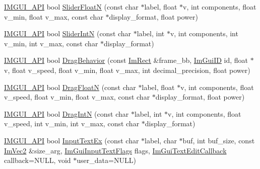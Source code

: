 \begin{DoxyCompactItemize}
\item 
\mbox{\hyperlink{imgui_8h_a43829975e84e45d1149597467a14bbf5}{I\+M\+G\+U\+I\+\_\+\+A\+PI}} bool \mbox{\hyperlink{namespace_im_gui_a3ffffbdfe59f18a2321dd1cb39dfb6e1}{Slider\+FloatN}} (const char $\ast$label, float $\ast$v, int components, float v\+\_\+min, float v\+\_\+max, const char $\ast$display\+\_\+format, float power)
\item 
\mbox{\hyperlink{imgui_8h_a43829975e84e45d1149597467a14bbf5}{I\+M\+G\+U\+I\+\_\+\+A\+PI}} bool \mbox{\hyperlink{namespace_im_gui_a13fe35db80c7d1002c98fd5e8ea90239}{Slider\+IntN}} (const char $\ast$label, int $\ast$v, int components, int v\+\_\+min, int v\+\_\+max, const char $\ast$display\+\_\+format)
\item 
\mbox{\hyperlink{imgui_8h_a43829975e84e45d1149597467a14bbf5}{I\+M\+G\+U\+I\+\_\+\+A\+PI}} bool \mbox{\hyperlink{namespace_im_gui_a4fdcba60dbe3762a144051add234ea48}{Drag\+Behavior}} (const \mbox{\hyperlink{struct_im_rect}{Im\+Rect}} \&frame\+\_\+bb, \mbox{\hyperlink{imgui_8h_a1785c9b6f4e16406764a85f32582236f}{Im\+Gui\+ID}} id, float $\ast$v, float v\+\_\+speed, float v\+\_\+min, float v\+\_\+max, int decimal\+\_\+precision, float power)
\item 
\mbox{\hyperlink{imgui_8h_a43829975e84e45d1149597467a14bbf5}{I\+M\+G\+U\+I\+\_\+\+A\+PI}} bool \mbox{\hyperlink{namespace_im_gui_a2a2764b6f0b3291ad0df4d99127dd751}{Drag\+FloatN}} (const char $\ast$label, float $\ast$v, int components, float v\+\_\+speed, float v\+\_\+min, float v\+\_\+max, const char $\ast$display\+\_\+format, float power)
\item 
\mbox{\hyperlink{imgui_8h_a43829975e84e45d1149597467a14bbf5}{I\+M\+G\+U\+I\+\_\+\+A\+PI}} bool \mbox{\hyperlink{namespace_im_gui_a2854d672b818938e6e9fb1de6de3dbe7}{Drag\+IntN}} (const char $\ast$label, int $\ast$v, int components, float v\+\_\+speed, int v\+\_\+min, int v\+\_\+max, const char $\ast$display\+\_\+format)
\item 
\mbox{\hyperlink{imgui_8h_a43829975e84e45d1149597467a14bbf5}{I\+M\+G\+U\+I\+\_\+\+A\+PI}} bool \mbox{\hyperlink{namespace_im_gui_a4a62260abe773d4e193db94cdfdc41bf}{Input\+Text\+Ex}} (const char $\ast$label, char $\ast$buf, int buf\+\_\+size, const \mbox{\hyperlink{struct_im_vec2}{Im\+Vec2}} \&size\+\_\+arg, \mbox{\hyperlink{imgui_8h_a7d2c6153a6b9b5d3178ce82434ac9fb8}{Im\+Gui\+Input\+Text\+Flags}} flags, \mbox{\hyperlink{imgui_8h_ae9254e6ad76a9bc7abc20929e07b29c5}{Im\+Gui\+Text\+Edit\+Callback}} callback=N\+U\+LL, void $\ast$user\+\_\+data=N\+U\+LL)
\item 

\end{DoxyCompactItemize}
